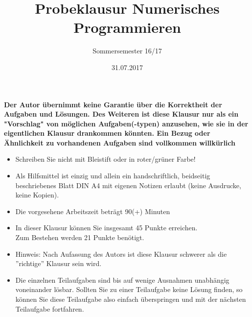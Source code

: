 \documentclass{scrartcl}
\begin{document}
\title{Probeklausur Numerisches Programmieren}
\subtitle{Sommersemester 16/17}
\author{\npauthor{}}
\date{31.07.2017}
\maketitle

\textbf{Der Autor übernimmt keine Garantie über die Korrektheit der Aufgaben und Lösungen. Des Weiteren ist diese Klausur nur als ein "Vorschlag" von möglichen Aufgaben(-typen) anzusehen, wie sie in der eigentlichen Klausur drankommen könnten. Ein Bezug oder Ähnlichkeit zu vorhandenen Aufgaben sind vollkommen willkürlich}
\sbreak

\begin{itemize}
	\item Schreiben Sie nicht mit Bleistift oder in roter/grüner Farbe!
	\item Als Hilfsmittel ist einzig und allein ein handschriftlich, beidseitig beschriebenes Blatt DIN A4 mit eigenen Notizen erlaubt (keine Ausdrucke, keine Kopien).
	\item Die vorgesehene Arbeitszeit beträgt 90(+) Minuten
	\item In dieser Klausur können Sie insgesamt 45 Punkte erreichen. \\Zum Bestehen werden 21 Punkte benötigt.
	\item Hinweis: Nach Aufassung des Autors ist diese Klausur schwerer als die ''richtige'' Klausur sein wird.
	\item Die einzelnen Teilaufgaben sind bis auf wenige Ausnahmen unabhängig voneinander lösbar.
	Sollten Sie zu einer Teilaufgabe keine Lösung finden, so können Sie diese Teilaufgabe also
	einfach überspringen und mit der nächsten Teilaufgabe fortfahren.
\end{itemize}
\end{document}
